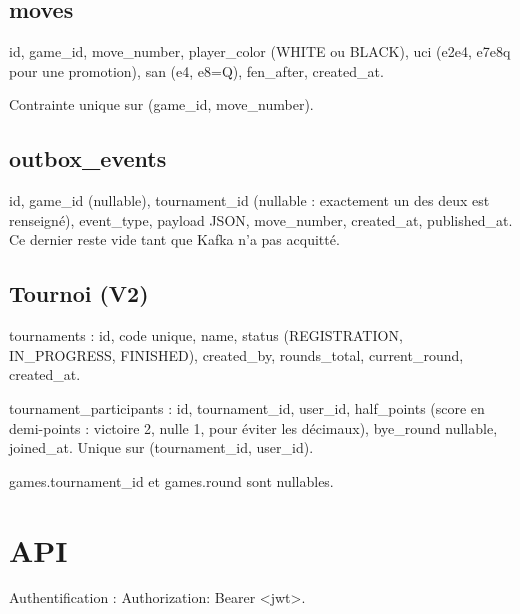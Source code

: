 \documentclass[11pt,a4paper]{article}
\newcommand{\field}[1]{{\ttfamily #1}}
\begin{document}
\subsection{moves}
\field{id}, \field{game\_id}, \field{move\_number}, \field{player\_color} (\field{WHITE} ou \field{BLACK}), \field{uci} (\field{e2e4}, \field{e7e8q} pour une promotion), \field{san} (\field{e4}, \field{e8=Q}), \field{fen\_after}, \field{created\_at}.

Contrainte unique sur \field{(game\_id, move\_number)}.

\subsection{outbox\_events}
\field{id}, \field{game\_id} (nullable), \field{tournament\_id} (nullable : exactement un des deux est renseigné), \field{event\_type}, \field{payload} JSON, \field{move\_number}, \field{created\_at}, \field{published\_at}. Ce dernier reste vide tant que Kafka n'a pas acquitté.

\subsection{Tournoi (V2)}
\field{tournaments} : \field{id}, \field{code} unique, \field{name}, \field{status} (\field{REGISTRATION}, \field{IN\_PROGRESS}, \field{FINISHED}), \field{created\_by}, \field{rounds\_total}, \field{current\_round}, \field{created\_at}.

\field{tournament\_participants} : \field{id}, \field{tournament\_id}, \field{user\_id}, \field{half\_points} (score en demi-points : victoire 2, nulle 1, pour éviter les décimaux), \field{bye\_round} nullable, \field{joined\_at}. Unique sur \field{(tournament\_id, user\_id)}.

\field{games.tournament\_id} et \field{games.round} sont nullables.

\section{API}

Authentification : \field{Authorization: Bearer <jwt>}.
\end{document}
